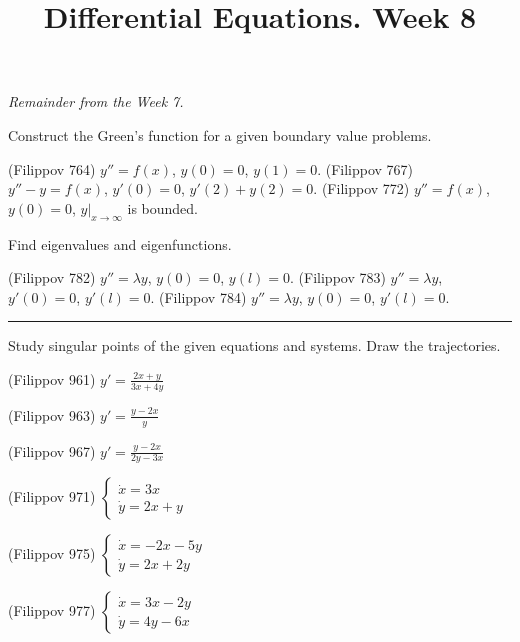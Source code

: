 \documentclass[14pt]{exam}
\title{Differential Equations. Week 8}
\date{}
\begin{document}
	\maketitle
	
	\textit{Remainder from the Week 7.}
	
	Construct the Green's function for a given boundary value problems.
	\begin{questions}
		\question (Filippov 764) $y'' = f(x)$, $y(0) = 0$, $y(1) = 0$.
		\question (Filippov 767) $y'' - y = f(x)$, $y'(0) = 0$, $y'(2) + y(2) = 0$.
		\question  (Filippov 772) $y'' = f(x)$, $y(0) = 0$, $y |_{x\to\infty}$ is bounded.
	\end{questions}
	
	Find eigenvalues and eigenfunctions.
	\begin{questions}
		\setcounter{question}{3}
		\question (Filippov 782) $y'' = \lambda y$, $y(0) = 0$, $y(l) = 0$.
		\question (Filippov 783) $y'' = \lambda y$, $y'(0) = 0$, $y'(l) = 0$.
		\question (Filippov 784) $y'' = \lambda y$, $y(0) = 0$, $y'(l) = 0$.
	\end{questions}
	
	\rule{6in}{1pt}
	
	Study singular points of the given equations and systems. Draw the trajectories.
	
	\begin{questions}
		\setcounter{question}{0}
		\question
		(Filippov 961) $y' = \frac{2x + y}{3x + 4y}$
		
		\question
		(Filippov 963) $y' = \frac{y - 2x}{y}$
		
		\question
		(Filippov 967) $y' = \frac{y - 2x}{2y - 3x}$
		
		\question
		(Filippov 971) $\begin{cases}
			\dot{x} = 3x\\
			\dot{y}=2x + y
		\end{cases}$
		
		\question
		(Filippov 975) $\begin{cases}
			\dot{x} = -2x - 5y\\
			\dot{y} = 2x + 2y
		\end{cases}$
		
		\question
		(Filippov 977) $\begin{cases}
			\dot{x} = 3x - 2y\\
			\dot{y} =  4y - 6x
		\end{cases}$
	\end{questions}
\end{document}
